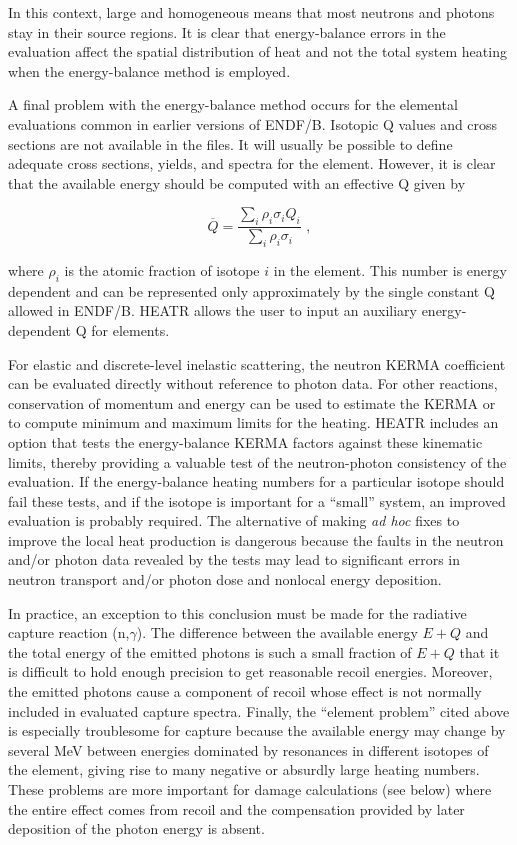 In this context, large and homogeneous means that most neutrons and
photons stay in their source regions.  It is clear that energy-balance
errors in the evaluation affect the spatial distribution of heat and
not the total system heating when the energy-balance method is
employed.

A final problem with the energy-balance method occurs for the
elemental evaluations common in earlier
versions of ENDF/B.  Isotopic Q values and cross sections
are not available in the files.  It will usually be possible to define
adequate cross sections, yields, and spectra for the element.  However,
it is clear that the available energy should be computed with an
effective Q given by

\begin{equation}
   \overline{Q}=\frac{\displaystyle\sum_i\rho_i\sigma_iQ_i}
      {\displaystyle\sum_i\rho_i\sigma_i}\,\,,
\end{equation}

\noindent
where $\rho_i$ is the atomic fraction of isotope $i$ in the element.
This number is energy dependent and can be represented only
approximately by the single constant Q allowed
in ENDF/B.  HEATR allows the user to input an auxiliary
energy-dependent Q for elements.

For elastic and discrete-level inelastic scattering, the neutron
KERMA coefficient can be evaluated directly without reference to
photon data.  For other reactions, conservation of momentum and
energy can be used to estimate the KERMA or to compute minimum and
maximum limits for the heating.  HEATR includes an option that tests
the energy-balance KERMA factors against these kinematic limits,
 thereby providing a valuable test
of the neutron-photon consistency of the evaluation.  If the
energy-balance heating numbers for a particular isotope should
fail these tests, and if the isotope is important for a ``small''
system, an improved evaluation is probably required.  The
alternative of making {\it ad hoc} fixes to improve the local heat
production is dangerous because the faults in the neutron and/or photon
data revealed by the tests may lead to significant errors in neutron
transport and/or photon dose and nonlocal energy deposition.

In practice, an exception to this conclusion must be made for the
radiative capture reaction (n,$\gamma$).  The difference between the
available energy $E{+}Q$ and the total energy of the emitted photons is
such a small fraction of $E{+}Q$ that it is difficult to hold enough
precision to get reasonable recoil energies.  Moreover, the emitted
photons cause a component of recoil whose effect is not normally
included in evaluated capture spectra.  Finally, the ``element
problem'' cited above is especially troublesome for capture because
the available energy may change by several MeV between energies
dominated by resonances in different isotopes of the element, giving
rise to many negative or absurdly large heating numbers.  These
problems are more important for damage calculations (see below) where
the entire effect comes from recoil and the compensation provided by
later deposition of the photon energy is absent.

